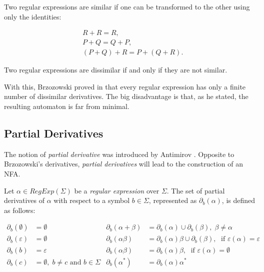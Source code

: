 \begin{defn} 
	Two regular expressions are similar if one can be transformed to the other using only the identities:
	
	\begin{align*}
		& R + R = R, \\
		& P + Q = Q + P, \\
		& (P + Q) + R = P + (Q + R).
	\end{align*}
	
	Two regular expressions are dissimilar if and only if they are not similar.
\end{defn}

With this, Brzozowski proved in \cite[Theorem 5.2]{brzozowski_derivatives} that every regular expression has only a finite number of dissimilar derivatives. The big disadvantage is that, as he stated, the resulting automaton is far from minimal.

\subsection{Partial Derivatives}
The notion of \textit{partial derivative} was introduced by Antimirov \cite{pdregex_antimirov}. Opposite to Brzozowski's derivatives, \textit{partial derivatives} will lead to the construction of an NFA.

Let $\alpha \in RegExp(\Sigma)$ be a \textit{regular expression} over $\Sigma$. The set of partial derivatives of $\alpha$ with respect to a symbol $b \in \Sigma$, represented as $\partial_b(\alpha)$, is defined as follows:

\begin{align*}
	\partial_b(\emptyset) &= \emptyset		&	\partial_b(\alpha + \beta) &= \partial_b(\alpha) \cup \partial_b(\beta), \; \beta \neq \alpha \\
	\partial_b(\varepsilon) &= \emptyset	&	\partial_b(\alpha \beta) &= \partial_b(\alpha)\beta \cup \partial_b(\beta), \; \text { if } \varepsilon(\alpha) = \varepsilon \\
	\partial_b(b) &= \varepsilon & \partial_b(\alpha \beta) &= \partial_b(\alpha)\beta, \; \text { if } \varepsilon(\alpha) = \emptyset \\
	\partial_b(c) &= \emptyset, \; b \neq c \text{ and } b \in \Sigma & \partial_b(\alpha^*) &= \partial_b(\alpha)\alpha^*
\end{align*}

